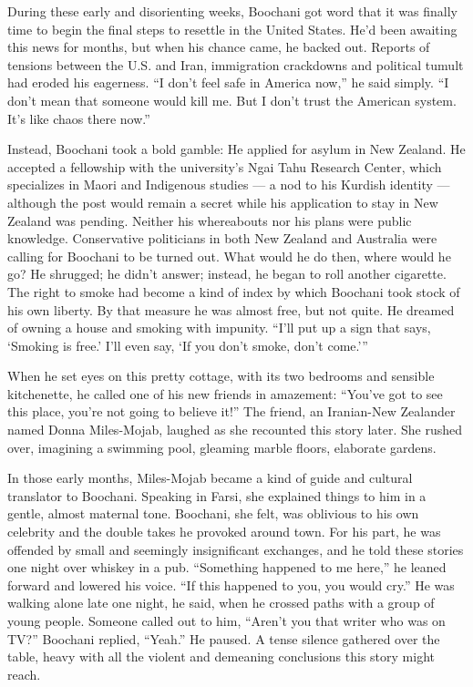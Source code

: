 During these early and disorienting weeks, Boochani got word that it was
finally time to begin the final steps to resettle in the United States.
He'd been awaiting this news for months, but when his chance came, he
backed out. Reports of tensions between the U.S. and Iran, immigration
crackdowns and political tumult had eroded his eagerness. ``I don't feel
safe in America now,'' he said simply. ``I don't mean that someone would
kill me. But I don't trust the American system. It's like chaos there
now.''

Instead, Boochani took a bold gamble: He applied for asylum in New
Zealand. He accepted a fellowship with the university's Ngai Tahu
Research Center, which specializes in Maori and Indigenous studies --- a
nod to his Kurdish identity --- although the post would remain a secret
while his application to stay in New Zealand was pending. Neither his
whereabouts nor his plans were public knowledge. Conservative
politicians in both New Zealand and Australia were calling for Boochani
to be turned out. What would he do then, where would he go? He shrugged;
he didn't answer; instead, he began to roll another cigarette. The right
to smoke had become a kind of index by which Boochani took stock of his
own liberty. By that measure he was almost free, but not quite. He
dreamed of owning a house and smoking with impunity. ``I'll put up a
sign that says, `Smoking is free.' I'll even say, `If you don't smoke,
don't come.'''

When he set eyes on this pretty cottage, with its two bedrooms and
sensible kitchenette, he called one of his new friends in amazement:
``You've got to see this place, you're not going to believe it!'' The
friend, an Iranian-New Zealander named Donna Miles-Mojab, laughed as she
recounted this story later. She rushed over, imagining a swimming pool,
gleaming marble floors, elaborate gardens.

In those early months, Miles-Mojab became a kind of guide and cultural
translator to Boochani. Speaking in Farsi, she explained things to him
in a gentle, almost maternal tone. Boochani, she felt, was oblivious to
his own celebrity and the double takes he provoked around town. For his
part, he was offended by small and seemingly insignificant exchanges,
and he told these stories one night over whiskey in a pub. ``Something
happened to me here,'' he leaned forward and lowered his voice. ``If
this happened to you, you would cry.'' He was walking alone late one
night, he said, when he crossed paths with a group of young people.
Someone called out to him, ``Aren't you that writer who was on TV?''
Boochani replied, ``Yeah.'' He paused. A tense silence gathered over the
table, heavy with all the violent and demeaning conclusions this story
might reach.

